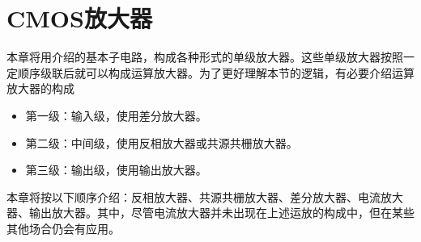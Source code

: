 \chapter{CMOS放大器}
本章将用介绍的基本子电路，构成各种形式的单级放大器。这些单级放大器按照一定顺序级联后就可以构成运算放大器。为了更好理解本节的逻辑，有必要介绍运算放大器的构成
\begin{itemize}
    \item 第一级：输入级，使用差分放大器。
    \item 第二级：中间级，使用反相放大器或共源共栅放大器。
    \item 第三级：输出级，使用输出放大器。
\end{itemize}
本章将按以下顺序介绍：反相放大器、共源共栅放大器、差分放大器、电流放大器、输出放大器。其中，尽管电流放大器并未出现在上述运放的构成中，但在某些其他场合仍会有应用。



